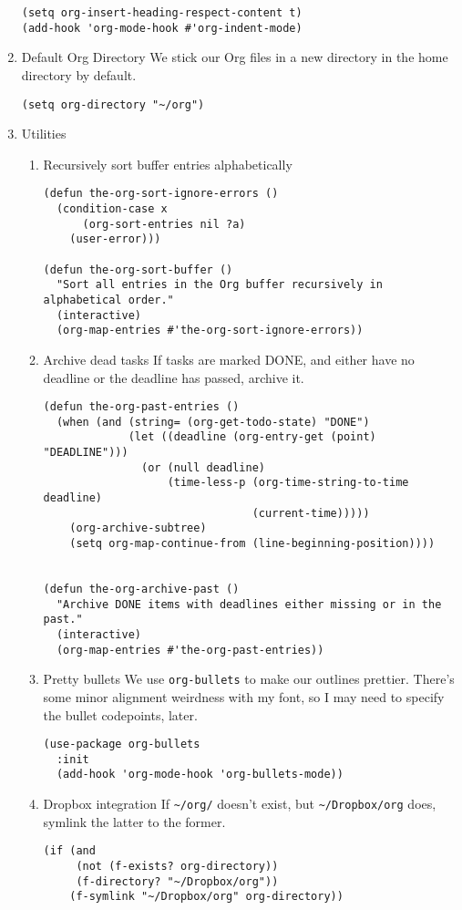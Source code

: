 \documentclass[11pt]{article}
\begin{document}
\begin{enumerate}
\begin{verbatim}
(setq org-insert-heading-respect-content t)
(add-hook 'org-mode-hook #'org-indent-mode)
\end{verbatim}

\item Default Org Directory
\label{sec:org2416bfb}
We stick our Org files in a new directory in the home directory by
default.
\begin{verbatim}
(setq org-directory "~/org")
\end{verbatim}
\item Utilities
\label{sec:org30bdf74}
\begin{enumerate}
\item Recursively sort buffer entries alphabetically
\label{sec:org1823f13}
\begin{verbatim}
(defun the-org-sort-ignore-errors ()
  (condition-case x
      (org-sort-entries nil ?a)
    (user-error)))

(defun the-org-sort-buffer ()
  "Sort all entries in the Org buffer recursively in alphabetical order."
  (interactive)
  (org-map-entries #'the-org-sort-ignore-errors))
\end{verbatim}

\item Archive dead tasks
\label{sec:org9ca83d0}
If tasks are marked DONE, and either have no deadline or the deadline
has passed, archive it.

\begin{verbatim}
(defun the-org-past-entries ()
  (when (and (string= (org-get-todo-state) "DONE")
             (let ((deadline (org-entry-get (point) "DEADLINE")))
               (or (null deadline)
                   (time-less-p (org-time-string-to-time deadline)
                                (current-time)))))
    (org-archive-subtree)
    (setq org-map-continue-from (line-beginning-position))))


(defun the-org-archive-past ()
  "Archive DONE items with deadlines either missing or in the past."
  (interactive)
  (org-map-entries #'the-org-past-entries))
\end{verbatim}

\item Pretty bullets
\label{sec:orgf750f48}
We use \texttt{org-bullets} to make our outlines prettier. There's some minor
alignment weirdness with my font, so I may need to specify the bullet
codepoints, later.
\begin{verbatim}
(use-package org-bullets
  :init
  (add-hook 'org-mode-hook 'org-bullets-mode))
\end{verbatim}

\item Dropbox integration
\label{sec:orgf193aa7}
If \texttt{\textasciitilde{}/org/} doesn't exist, but \texttt{\textasciitilde{}/Dropbox/org} does, symlink the
latter to the former.
\begin{verbatim}
(if (and
     (not (f-exists? org-directory))
     (f-directory? "~/Dropbox/org"))
    (f-symlink "~/Dropbox/org" org-directory))
\end{verbatim}
\end{enumerate}
\end{enumerate}
\end{document}
